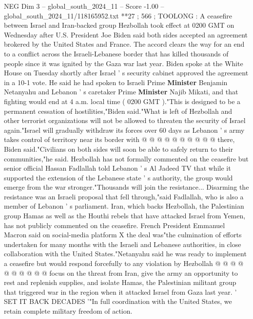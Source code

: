 \begin{textsample}{NEG Dim 3 – global\_south\_2024\_11 – Score -1.00 – global\_south\_2024\_11/118165952.txt}  \label{ex:f3_neg_140}
**27 ; 566 ; TOOLONG : A ceasefire between Israel and Iran-backed group Hezbollah took effect at 0200 GMT on Wednesday after U.S.
President Joe Biden said both sides accepted an agreement brokered by the United States and France.
The accord clears the way for an end to a conflict across the Israeli-Lebanese border that has killed thousands of people since it was ignited by the Gaza war last year.
Biden spoke at the White House on Tuesday shortly after Israel ' s security cabinet approved the agreement in a 10-1 vote.
He said he had spoken to Israeli Prime \textbf{Minister} Benjamin Netanyahu and Lebanon ' s caretaker Prime \textbf{Minister} Najib Mikati, and that fighting would end at 4 a.m. local time ( 0200 GMT )."This is designed to be a permanent cessation of hostilities,"Biden said."What is left of Hezbollah and other terrorist organizations will not be allowed to threaten the security of Israel again."Israel will gradually withdraw its forces over 60 days as Lebanon ' s army takes control of territory near its border with @ @ @ @ @ @ @ @ @ @ there, Biden said."Civilians on both sides will soon be able to safely return to their communities,"he said.
Hezbollah has not formally commented on the ceasefire but senior official Hassan Fadlallah told Lebanon ' s Al Jadeed TV that while it supported the extension of the Lebanese state ' s authority, the group would emerge from the war stronger."Thousands will join the resistance...
Disarming the resistance was an Israeli proposal that fell through,"said Fadlallah, who is also a member of Lebanon ' s parliament.
Iran, which backs Hezbollah, the Palestinian group Hamas as well as the Houthi rebels that have attacked Israel from Yemen, has not publicly commented on the ceasefire.
French President Emmanuel Macron said on social-media platform X the deal was"the culmination of efforts undertaken for many months with the Israeli and Lebanese authorities, in close collaboration with the United States."Netanyahu said he was ready to implement a ceasefire but would respond forcefully to any violation by Hezbollah @ @ @ @ @ @ @ @ @ @ focus on the threat from Iran, give the army an opportunity to rest and replenish supplies, and isolate Hamas, the Palestinian militant group that triggered war in the region when it attacked Israel from Gaza last year. ' SET IT BACK DECADES '"In full coordination with the United States, we retain complete military freedom of action.

\end{textsample}
